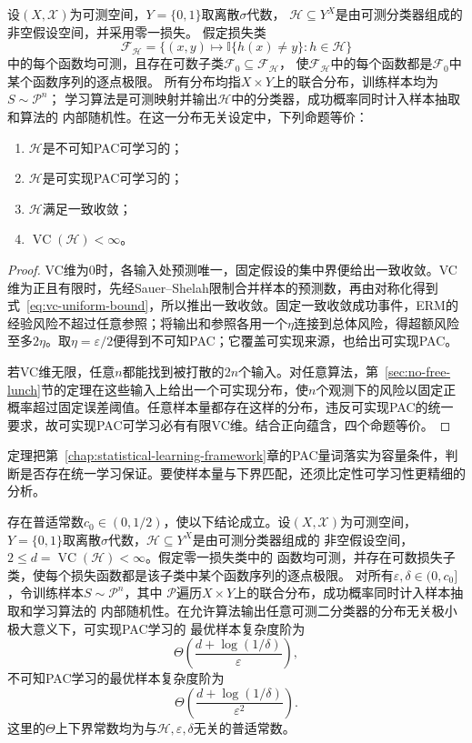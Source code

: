 \begin{theorem}[二分类学习基本定理]
\label{thm:binary-fundamental-theorem}
设$(X,\mathcal X)$为可测空间，$Y=\{0,1\}$取离散$\sigma$代数，
$\mathcal H\subseteq Y^X$是由可测分类器组成的非空假设空间，并采用零一损失。
假定损失类
\[
 \mathcal F_{\mathcal H}
 =\{(x,y)\mapsto\mathbb I\{h(x)\neq y\}:h\in\mathcal H\}
\]
中的每个函数均可测，且存在可数子类$\mathcal F_0\subseteq\mathcal F_{\mathcal H}$，
使$\mathcal F_{\mathcal H}$中的每个函数都是$\mathcal F_0$中某个函数序列的逐点极限。
所有分布均指$X\times Y$上的联合分布，训练样本均为$S\sim\mathcal P^n$；
学习算法是可测映射并输出$\mathcal H$中的分类器，成功概率同时计入样本抽取和算法的
内部随机性。在这一分布无关设定中，下列命题等价：
\begin{enumerate}
 \item $\mathcal H$是不可知PAC可学习的；
 \item $\mathcal H$是可实现PAC可学习的；
 \item $\mathcal H$满足一致收敛；
 \item $\operatorname{VC}(\mathcal H)<\infty$。
\end{enumerate}
\end{theorem}
\begin{proof}
VC维为0时，各输入处预测唯一，固定假设的集中界便给出一致收敛。VC维为正且有限时，先经Sauer--Shelah限制合并样本的预测数，再由对称化得到式~\eqref{eq:vc-uniform-bound}，所以推出一致收敛。固定一致收敛成功事件，ERM的经验风险不超过任意参照；将输出和参照各用一个$\eta$连接到总体风险，得超额风险至多$2\eta$。取$\eta=\varepsilon/2$便得到不可知PAC；它覆盖可实现来源，也给出可实现PAC。

若VC维无限，任意$n$都能找到被打散的$2n$个输入。对任意算法，第~\ref{sec:no-free-lunch}节的定理在这些输入上给出一个可实现分布，使$n$个观测下的风险以固定正概率超过固定误差阈值。任意样本量都存在这样的分布，违反可实现PAC的统一要求，故可实现PAC可学习必有有限VC维。结合正向蕴含，四个命题等价。
\end{proof}

定理把第~\ref{chap:statistical-learning-framework}章的PAC量词落实为容量条件，判断是否存在统一学习保证。要使样本量与下界匹配，还须比定性可学习性更精细的分析。

\begin{theorem}[二分类的最优样本复杂度阶]
\label{thm:binary-optimal-sample-complexity}
存在普适常数$c_0\in(0,1/2)$，使以下结论成立。设$(X,\mathcal X)$为可测空间，
$Y=\{0,1\}$取离散$\sigma$代数，$\mathcal H\subseteq Y^X$是由可测分类器组成的
非空假设空间，$2\leq d=\operatorname{VC}(\mathcal H)<\infty$。假定零一损失类中的
函数均可测，并存在可数损失子类，使每个损失函数都是该子类中某个函数序列的逐点极限。
对所有$\varepsilon,\delta\in(0,c_0]$，令训练样本$S\sim\mathcal P^n$，其中
$\mathcal P$遍历$X\times Y$上的联合分布，成功概率同时计入样本抽取和学习算法的
内部随机性。在允许算法输出任意可测二分类器的分布无关极小极大意义下，可实现PAC学习的
最优样本复杂度阶为
\[
 \Theta\left(\frac{d+\log(1/\delta)}{\varepsilon}\right),
\]
不可知PAC学习的最优样本复杂度阶为
\[
 \Theta\left(\frac{d+\log(1/\delta)}{\varepsilon^2}\right).
\]
这里的$\Theta$上下界常数均为与$\mathcal H,\varepsilon,\delta$无关的普适常数。
\end{theorem}

